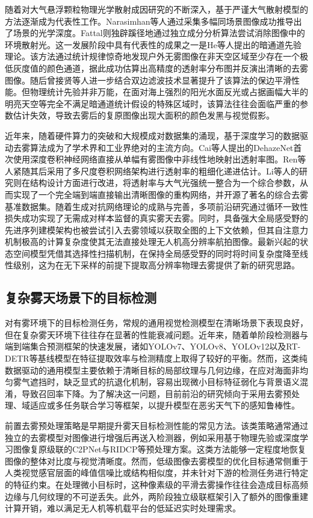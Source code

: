 随着对大气悬浮颗粒物理光学散射成因研究的不断深入，基于严谨大气散射模型的方法逐渐成为代表性工作。Narasimhan等人\cite{ref58}通过采集多幅同场景图像成功推导出了场景的光学深度。Fattal\cite{ref60}则独辟蹊径地通过独立成分分析算法尝试消除图像中的环境散射光。这一发展阶段中具有代表性的成果之一是He等人\cite{ref61}提出的暗通道先验理论。该方法通过统计规律惊奇地发现户外无雾图像在非天空区域至少存在一个极低灰度值的颜色通道，据此成功估算出高精度的透射率分布图并反演出清晰的去雾图像。随后曾接贤等人\cite{ref62}进一步结合双边滤波技术显著提升了该算法的保边平滑性能。但物理统计先验并非万能，在面对海上强烈的阳光水面反光或占据画幅大半的明亮天空等完全不满足暗通道统计假设的特殊区域时，该算法往往会面临严重的参数估计失效，导致去雾后的复原图像出现大面积的颜色发黑与视觉假影。

近年来，随着硬件算力的突破和大规模成对数据集的涌现，基于深度学习的数据驱动去雾算法成为了学术界和工业界绝对的主流方向。Cai等人\cite{ref63}提出的DehazeNet首次使用深度卷积神经网络直接从单幅有雾图像中非线性地映射出透射率图。Ren等人\cite{ref64}紧随其后采用了多尺度卷积网络架构进行透射率的粗细化递进估计。Li等人\cite{ref65}的研究则在结构设计方面进行改进，将透射率与大气光强统一整合为一个综合参数，从而实现了一个完全端到端直接输出清晰图像的重构网络，并开源了著名的综合去雾基准数据集\cite{ref66}。随着生成对抗网络理论的成熟与完善，多项前沿研究\cite{ref69, ref71}通过循环一致性损失成功实现了无需成对样本监督的真实雾天去雾。同时，具备强大全局感受野的先进序列建模架构\cite{ref72}也被尝试引入去雾领域以获取全图的上下文依赖，但其自注意力机制极高的计算复杂度使其无法直接处理无人机高分辨率航拍图像。最新兴起的状态空间模型凭借其选择性扫描机制，在保持全局感受野的同时将时间复杂度降至线性级别，这为在无下采样的前提下提取高分辨率物理去雾提供了新的研究思路。

\subsection{复杂雾天场景下的目标检测}
对有雾环境下的目标检测任务，常规的通用视觉检测模型在清晰场景下表现良好，但在复杂雾天环境下往往存在显著的性能衰减问题。近年来，随着单阶段检测器与端到端集合预测框架的快速发展，诸如YOLOv7、YOLOv8、YOLOv12以及RT-DETR等基线模型在特征提取效率与检测精度上取得了较好的平衡。然而，这类纯数据驱动的通用模型主要依赖于清晰目标的局部纹理与几何边缘，在应对海面非均匀雾气遮挡时，缺乏显式的抗退化机制，容易出现微小目标特征弱化与背景语义混淆，导致召回率下降。为了解决这一问题，目前前沿的研究倾向于采用去雾预处理、域适应或多任务联合学习等框架，以提升模型在恶劣天气下的感知鲁棒性。

前置去雾预处理策略是早期提升雾天目标检测性能的常见方法。该类策略通常通过独立的去雾模型对图像进行增强后再送入检测器，例如采用基于物理先验或深度学习图像复原级联的C2PNet与RIDCP等预处理方案。这类方法能够一定程度地恢复图像的整体对比度与视觉清晰度。然而，低级图像去雾模型的优化目标通常侧重于人类视觉感官层面的峰值信噪比或结构相似度，并未针对下游的检测任务进行特定的特征约束。在处理微小目标时，这种像素级的平滑去雾操作往往会造成目标高频边缘与几何纹理的不可逆丢失。此外，两阶段独立级联框架引入了额外的图像重建计算开销，难以满足无人机等机载平台的低延迟实时处理需求。

